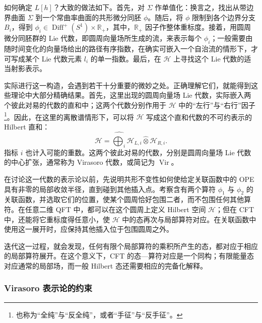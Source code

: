 如何确定 $L[h]$？大致的做法如下。首先，对 $\Sigma$ 作单值化：换言之，找出从带边界曲面 $\Sigma$ 到一个常曲率曲面的共形微分同胚 $\phi$。随后，将 $\phi$ 限制到各个边界分支 $B_i$，得到 $\phi_i\in\operatorname{Diff}^+(S^1)\times\mathbb{R}_+$，其中，$\mathbb{R}_+$ 因子作整体重标度。接着，用圆周微分同胚群的 Lie 代数，即圆周向量场所生成的流，来表示每个 $\phi_i$；一般需要由随时间变化的向量场给出的路径有序指数，在确实可嵌入一个自治流的情形下，才可写成某个 Lie 代数元素 $l_i$ 的单一指数。最后，在 $\mathcal{H}$ 上寻找这个 Lie 代数的适当射影表示。

实际进行这一构造，会遇到若干十分重要的微妙之处。正确理解它们，就能得到这些理论中大部分精确结果。首先，这里出现的圆周向量场 Lie 代数，实际嵌入两个彼此对易的代数的直和中；这两个代数分别作用于 $\mathcal{H}$ 中的“左行”与“右行”因子\footnote{也称为“全纯”与“反全纯”，或者“手征”与“反手征”。}。因此，在这里的离散谱情形下，可以将 $\mathcal{H}$ 写成这个直和代数的不可约表示的 Hilbert 直和：
\begin{equation}\label{eq:3.29}
\mathcal{H}=\widehat{\bigoplus_i}
\mathcal{H}_{L,i}\widehat\otimes\mathcal{H}_{R,i}.
\end{equation}
指标 $i$ 也计入可能的重数。这两个彼此对易的代数，分别是圆周向量场 Lie 代数的中心扩张，通常称为 Virasoro 代数，或简记为 $\operatorname{Vir}$。

在讨论这一代数的表示论以前，先说明共形不变性如何使给定关联函数中的 OPE具有非零的局部收敛半径，直到碰到其他插入点。考察含有两个算符 $\phi_1$ 与 $\phi_2$ 的关联函数，并选取它们的位置，使某个圆周恰好包围二者，而不包围任何其他算符。在任意二维 QFT 中，都可以在这个圆周上定义 Hilbert 空间 $\mathcal{H}$；但在 CFT 中，还能将它重标度得任意小，使 $\mathcal{H}$ 中的态再次与局部算符对应。在关联函数中使用这一展开时，应保持其他插入位于包围圆周之外。

迭代这一过程，就会发现，任何有限个局部算符的乘积所产生的态，都对应于相应的局部算符展开。在这个意义下，CFT 的态—算符对应是一个同构；有限能量态对应通常的局部场，而一般 Hilbert 态还需要相应的完备化解释。

\subsubsection{Virasoro 表示论的约束}\label{sec:3.2.2.1}

